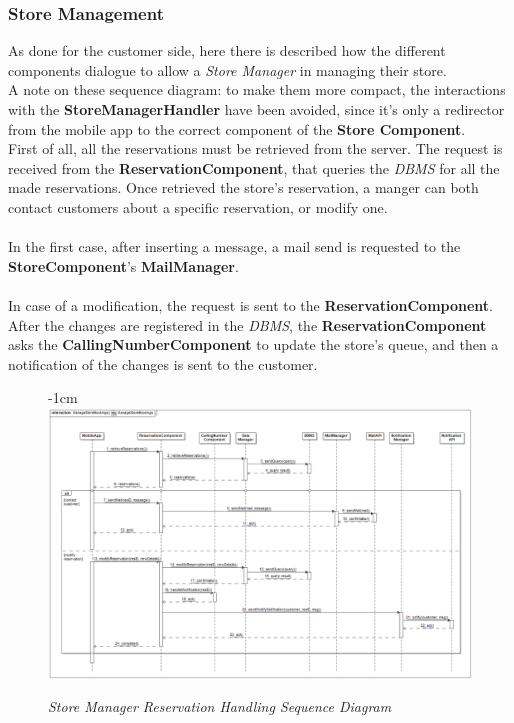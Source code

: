 \documentclass{article}
\begin{document}
	\subsubsection{Store Management}
	As done for the customer side, here there is described how the different components dialogue to allow a \emph{Store Manager} in managing their store.\\
	A note on these sequence diagram: to make them more compact, the interactions with the {\bfseries StoreManagerHandler} have been avoided, since it's only a redirector from the mobile app to the correct component of the {\bfseries Store Component}.\\
	First of all, all the reservations must be retrieved from the server. The request is received from the {\bfseries ReservationComponent}, that queries the \emph{DBMS} for all the made reservations. Once retrieved the store's reservation, a manger can both contact customers about a specific reservation, or modify one.\\\\
	In the first case, after inserting a message, a mail send is requested to the {\bfseries StoreComponent}'s {\bfseries MailManager}.\\\\
	In case of a modification, the request is sent to the {\bfseries ReservationComponent}. After the changes are registered in the \emph{DBMS}, the {\bfseries ReservationComponent} asks the {\bfseries CallingNumberComponent} to update the store's queue, and then a notification of the changes is sent to the customer. 
		\begin{figure}[H]
		\begin{adjustwidth} {-1cm}{}
			\centering
			\includegraphics[scale=0.3]{Sequence Diagrams/sd__ManageStoreBookings__ManageStoreBookings.png}
		\end{adjustwidth}
		\caption{\emph{Store Manager Reservation Handling Sequence Diagram}}
	\end{figure}
\end{document}
